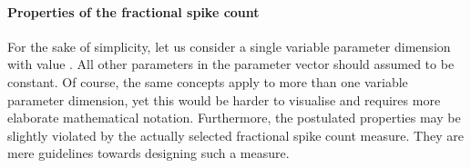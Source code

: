 \paragraph{Properties of the fractional spike count}
For the sake of simplicity, let us consider a single variable parameter dimension with value \nParam. All other parameters in the parameter vector \nParams should assumed to be constant. Of course, the same concepts apply to more than one variable parameter dimension, yet this would be harder to visualise and requires more elaborate mathematical notation. Furthermore, the postulated properties may be slightly violated by the actually selected fractional spike count measure. They are mere guidelines towards designing such a measure.

